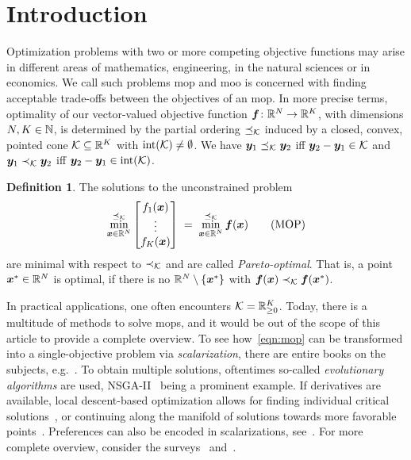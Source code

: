 \documentclass{article}
\theoremstyle{plain}
\theoremstyle{definition}
\newtheorem{definition}[theorem]{Definition}
\begin{document}
\section{Introduction}
Optimization problems with two or more competing objective functions may
arise in different areas of mathematics, engineering, in the natural sciences
or in economics.
We call such problems \ac{mop} and 
\ac{moo} is concerned with finding acceptable trade-offs between the objectives of 
an \ac{mop}.
In more precise terms, optimality of our vector-valued objective function 
$\bm{f} \colon \mathbb R^N \to \mathbb R^K$, with dimensions $N, K \in \mathbb N$,
is determined by the partial ordering $\preceq_\mathcal K$ induced by a closed, convex, pointed cone 
$\mathcal K \subseteq \mathbb R^K$ with $\operatorname{int}(\mathcal K) \neq \emptyset$.
We have $\bm{y}_1 \preceq_\mathcal K \bm{y}_2$ iff $\bm{y}_2 - \bm{y}_1 \in \mathcal K$
and
$\bm{y}_1 \prec_\mathcal K \bm{y}_2$ iff $\bm{y}_2 - \bm{y}_1 \in \operatorname{int}(\mathcal K)$.
\begin{definition}
	The solutions to the unconstrained problem
	\begin{equation}
		\operatorname*{min}^{\preceq_\mathcal K}_{\bm{x} \in \mathbb R^N}
		\begin{bmatrix}
			f_1(\bm{x})
			\\
			\vdots
			\\
			f_K(\bm{x})
		\end{bmatrix}
		\;
		=
		\;
		\operatorname*{min}^{\preceq_\mathcal K}_{\bm{x} \in \mathbb R^N} \bm{f}(\bm{x})
		\tag{MOP}
		\label{eqn:mop}
	\end{equation}
	are minimal with respect to $\prec_\mathcal K$ and are called \emph{Pareto-optimal}.
	That is, a point $\bm{x}^*\in\mathbb R^N$ is optimal, 
	if there is no $\mathbb R^N\setminus\{\bm{x}^*\}$ with 
	$\bm{f}(\bm{x}) \prec_\mathcal K \bm{f}(\bm{x}^*)$.
\end{definition}
In practical applications, one often encounters $\mathcal K = \mathbb R^K_{\ge 0}$.
Today, there is a multitude of methods to solve \acp{mop},
and it would be out of the scope of this article to provide a complete 
overview.
To see how~\eqref{eqn:mop} can be transformed into a 
single-objective problem
via \emph{scalarization}, there are entire books on the subjects, 
e.g.~\cite{ehrgottMulticriteriaOptimization2005}.
To obtain multiple solutions, oftentimes so-called 
\emph{evolutionary algorithms} are used, 
NSGA-II~\cite{debFastElitistMultiobjective2002} being 
a prominent example.
If derivatives are available, local descent-based optimization 
allows for finding individual critical 
solutions~\cite{%
mukaiAlgorithmsMulticriterionOptimization1980a,%
fliegeSteepestDescentMethods2000,%
fukudaSURVEYMULTIOBJECTIVEDESCENT2014%
}, or continuing along the manifold of solutions towards more 
favorable points~\cite{%
hillermeierNonlinearMultiobjectiveOptimization2001,%
martinParetoTracerPredictor2018%
}.
Preferences can also be encoded in scalarizations, see~\cite{%
eichfelderAdaptiveScalarizationMethods2008,%
miettinenNonlinearMultiobjectiveOptimization2013%
}.
For more complete overview, consider the surveys~\cite{peitzSurveyRecentTrends2018}
and~\cite{eichfelderTwentyYearsContinuous}.
\end{document}
